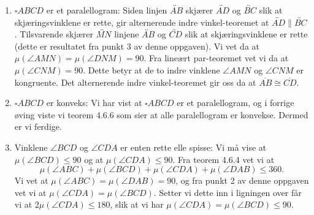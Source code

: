 \begin{oppgave}[4.8.5]
\begin{enumerate}
        \item $\square ABCD$ er et paralellogram: 
        Siden linjen $\overleftrightarrow{AB}$ skjærer $\overleftrightarrow{AD}$ og $\overleftrightarrow{BC}$ slik at skjæringsvinklene er rette, gir alternerende indre vinkel-teoremet at $\overleftrightarrow{AD}\parallel\overleftrightarrow{BC}$. 
        Tilsvarende skjærer $\overleftrightarrow{MN}$ linjene $\overleftrightarrow{AB}$ og $\overleftrightarrow{CD}$ slik at skjæringsvinklene er rette (dette er resultatet fra punkt 3 av denne oppgaven). 
        Vi vet da at $\mu(\angle AMN) = \mu(\angle DNM)=90$. 
        Fra lineært par-teoremet vet vi da at $\mu(\angle CNM)=90$. 
        Dette betyr at de to indre vinklene $\angle AMN$ og $\angle CNM$ er kongruente. 
        Det alternerende indre vinkel-teoremet gir oss da at $\overline{AB}\cong \overline{CD}$. 

        \item $\square ABCD$ er konveks: 
        Vi har vist at $\square ABCD$ er et paralellogram, og i forrige øving viste vi teorem 4.6.6 som sier at alle paralellogram er konvekse. 
        Dermed er vi ferdige.

        \item Vinklene $\angle BCD$ og $\angle CDA$ er enten rette elle spisse: 
        Vi må vise at $\mu(\angle BCD)\leq 90$ og at $\mu(\angle CDA)\leq 90$. 
        Fra teorem 4.6.4 vet vi at 
        $$\mu(\angle ABC)+\mu(\angle BCD)+\mu(\angle CDA)+\mu(\angle DAB)\leq 360.$$
        Vi vet at $\mu(\angle ABC)=\mu(\angle DAB)=90$, og fra punkt 2 av denne oppgaven vet vi at $\mu(\angle CDA)=\mu(\angle BCD)$. 
        Setter vi dette inn i ligningen over får vi at $2\mu(\angle CDA)\leq 180$, slik at vi har $\mu(\angle CDA)=\mu(\angle BCD)\leq 90$. 
    \end{enumerate} 
\end{oppgave}

